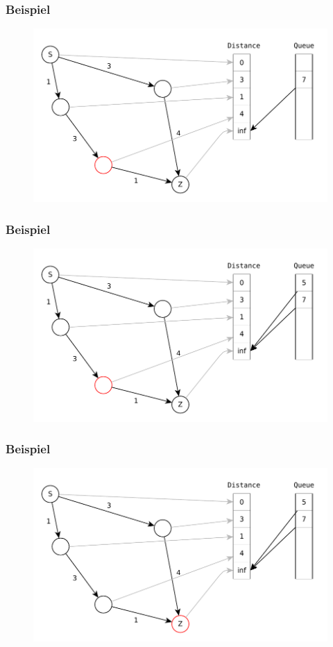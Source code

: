 \begin{frame}
\frametitle{Beispiel}
\begin{figure}
\includegraphics[scale=.8]{dijkstra_graphs/dijkstra_6.pdf}
\end{figure}
\end{frame}

\begin{frame}
\frametitle{Beispiel}
\begin{figure}
\includegraphics[scale=.8]{dijkstra_graphs/dijkstra_7.pdf}
\end{figure}
\end{frame}

\begin{frame}
\frametitle{Beispiel}
\begin{figure}
\includegraphics[scale=.8]{dijkstra_graphs/dijkstra_8.pdf}
\end{figure}
\end{frame}

